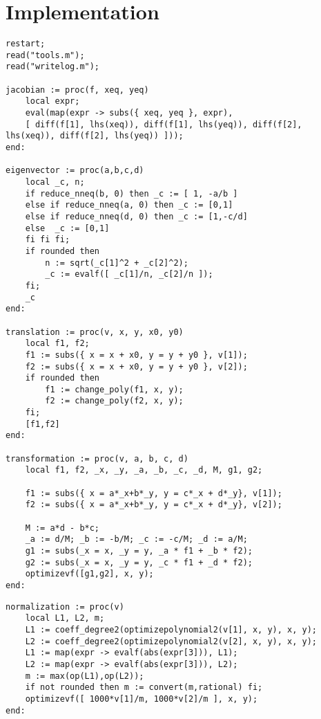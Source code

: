 \documentclass[a4paper,10pt]{article}
\begin{document}
\section{Implementation}

\begin{lstlisting}[name=type]
restart;
read("tools.m");
read("writelog.m");

jacobian := proc(f, xeq, yeq)
    local expr;
    eval(map(expr -> subs({ xeq, yeq }, expr),
    [ diff(f[1], lhs(xeq)), diff(f[1], lhs(yeq)), diff(f[2], lhs(xeq)), diff(f[2], lhs(yeq)) ]));
end:

eigenvector := proc(a,b,c,d)
    local _c, n;
    if reduce_nneq(b, 0) then _c := [ 1, -a/b ]
    else if reduce_nneq(a, 0) then _c := [0,1]
    else if reduce_nneq(d, 0) then _c := [1,-c/d]
    else  _c := [0,1]
    fi fi fi;
    if rounded then
        n := sqrt(_c[1]^2 + _c[2]^2);
        _c := evalf([ _c[1]/n, _c[2]/n ]);
    fi;
    _c
end:

translation := proc(v, x, y, x0, y0)
    local f1, f2;
    f1 := subs({ x = x + x0, y = y + y0 }, v[1]);
    f2 := subs({ x = x + x0, y = y + y0 }, v[2]);
    if rounded then
        f1 := change_poly(f1, x, y);
        f2 := change_poly(f2, x, y);
    fi;
    [f1,f2]
end:

transformation := proc(v, a, b, c, d)
    local f1, f2, _x, _y, _a, _b, _c, _d, M, g1, g2;

    f1 := subs({ x = a*_x+b*_y, y = c*_x + d*_y}, v[1]);
    f2 := subs({ x = a*_x+b*_y, y = c*_x + d*_y}, v[2]);

    M := a*d - b*c;
    _a := d/M; _b := -b/M; _c := -c/M; _d := a/M;
    g1 := subs(_x = x, _y = y, _a * f1 + _b * f2);
    g2 := subs(_x = x, _y = y, _c * f1 + _d * f2);
    optimizevf([g1,g2], x, y);
end:
\end{lstlisting}

\begin{lstlisting}[name=type]
normalization := proc(v)
    local L1, L2, m;
    L1 := coeff_degree2(optimizepolynomial2(v[1], x, y), x, y);
    L2 := coeff_degree2(optimizepolynomial2(v[2], x, y), x, y);
    L1 := map(expr -> evalf(abs(expr[3])), L1);
    L2 := map(expr -> evalf(abs(expr[3])), L2);
    m := max(op(L1),op(L2));
    if not rounded then m := convert(m,rational) fi;
    optimizevf([ 1000*v[1]/m, 1000*v[2]/m ], x, y);
end:
\end{lstlisting}
\end{document}

